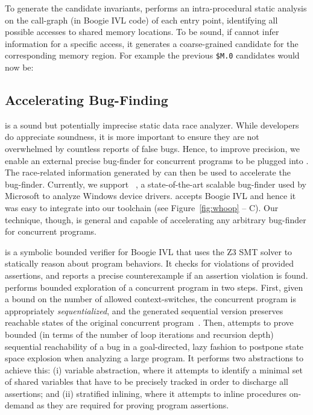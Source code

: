To generate the candidate invariants, \whoop performs an intra-procedural static analysis on the call-graph (in Boogie IVL code) of each entry point, identifying all possible accesses to shared memory locations. To be sound, if \whoop cannot infer information for a specific access, it generates a coarse-grained candidate for the corresponding memory region. For example the previous \texttt{\$M.0} candidates would now be:


\subsection{Accelerating Bug-Finding}
\label{whoop:bugfinding}

\whoop is a sound but potentially imprecise static data race analyzer.  While developers do appreciate soundness, it is more important to ensure they are not overwhelmed by countless reports of false bugs.  Hence, to improve precision, we enable an external precise bug-finder for concurrent programs to be plugged into \whoop. The race-related information generated by \whoop can then be used to accelerate the bug-finder.  Currently, we support \corral~\cite{lal2012corral, lal2014powering}, a state-of-the-art scalable bug-finder used by Microsoft to analyze Windows device drivers. \corral accepts Boogie IVL and hence it was easy to integrate into our toolchain (see Figure~\ref{fig:whoop} -- C). Our technique, though, is general and capable of accelerating any arbitrary bug-finder for concurrent programs.

\corral is a symbolic bounded verifier for Boogie IVL that uses the Z3 SMT solver to statically reason about program behaviors. It checks for violations of provided assertions, and reports a precise counterexample if an assertion violation is found. \corral performs bounded exploration of a concurrent program in two steps. First, given a bound on the number of allowed context-switches, the concurrent program is appropriately \emph{sequentialized}, and the generated sequential version preserves reachable states of the original concurrent program~\cite{popl2011-eqr,cav2009-lqr,cavLalR08}. Then, \corral attempts to prove bounded (in terms of the number of loop iterations and recursion depth) sequential reachability of a bug in a goal-directed, lazy fashion to postpone state space explosion when analyzing a large program. It performs two abstractions to achieve this: (i) variable abstraction, where it attempts to identify a minimal set of shared variables that have to be precisely tracked in order to discharge all assertions; and (ii) stratified inlining, where it attempts to inline procedures on-demand as they are required for proving program assertions.

